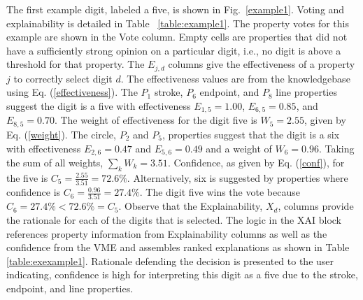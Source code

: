 \documentclass[conference]{IEEEtran}
\begin{document}
The first example digit, labeled a five, is shown in Fig.~\ref{example1}.
Voting and explainability is detailed in Table ~\ref{table:example1}.  The
property votes for this example are shown in the Vote column.  Empty cells are
properties that did not have a sufficiently strong opinion on a particular
digit, i.e., no digit is above a threshold for that property.   The $E_{j,d}$
columns give the effectiveness of a property $j$ to correctly select digit $d$.
The effectiveness values are from the knowledgebase using Eq.
(\ref{effectiveness}).   The $P_1$ stroke, $P_6$ endpoint, and $P_8$ line
properties suggest the digit is a five with effectiveness $E_{1,5}= 1.00$,
$E_{6,5}=0.85$, and $E_{8,5}=0.70$.  The weight of effectiveness for the digit
five is $W_5=2.55$, given by Eq. (\ref{weight}).  The circle, $P_2$ and $P_5$,
properties suggest that the digit is a six with effectiveness $E_{2,6}=0.47$ and
$E_{5,6}=0.49$  and a weight of $W_6=0.96$.  Taking the sum of all weights,
$\sum\limits_k W_k=3.51$.  Confidence, as given by Eq. (\ref{conf}), for the
five is $C_5=\frac{2.55}{3.51} = 72.6\%$.  Alternatively, six is suggested by
properties where confidence is $C_6=\frac{0.96}{3.51}=27.4\%$.  The digit five
wins the vote because $C_6=27.4\% < 72.6\%=C_5$.  Observe that the
Explainability, $X_d$, columns provide the rationale for each of the digits that
is selected.  The logic in the XAI block references property information from
Explainability columns as well as the confidence from the VME and assembles
ranked explanations as shown in Table~ \ref{table:exexample1}.   Rationale
defending the decision is presented to the user indicating, confidence is high
for interpreting this digit as a five due to the stroke, endpoint, and line
properties. 


\end{document}
